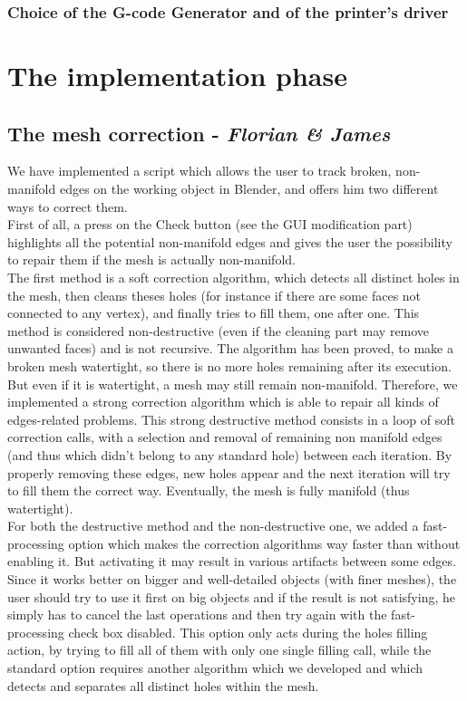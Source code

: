 \documentclass{report}
\begin{document}
\subsection{Choice of the G-code Generator and of the printer's driver}

\chapter{The implementation phase}

\section{The mesh correction - \textit{Florian \& James}}

We have implemented a script which allows the user to track broken, non-manifold edges on the working object in Blender, and offers him two different ways to correct them.\\

First of all, a press on the Check button (see the GUI modification part) highlights all the potential non-manifold edges and gives the user the possibility to repair them if the mesh is actually non-manifold.\\

The first method is a soft correction algorithm, which detects all distinct holes in the mesh, then cleans theses holes (for instance if there are some faces not connected to any vertex), and finally tries to fill them, one after one. This method is considered non-destructive (even if the cleaning part may remove unwanted faces) and is not recursive. The algorithm has been proved, to make a broken mesh watertight, so there is no more holes remaining after its execution.\\

But even if it is watertight, a mesh may still remain non-manifold. Therefore, we implemented a strong correction algorithm which is able to repair all kinds of edges-related problems. This strong destructive method consists in a loop of soft correction calls, with a selection and removal of remaining non manifold edges (and thus which didn't belong to any standard hole) between each iteration. By properly removing these edges, new holes appear and the next iteration will try to fill them the correct way. Eventually, the mesh is fully manifold (thus watertight).\\

For both the destructive method and the non-destructive one, we added a fast-processing option which makes the correction algorithms way faster than without enabling it. But activating it may result in various artifacts between some edges. Since it works better on bigger and well-detailed objects (with finer meshes), the user should try to use it first on big objects and if the result is not satisfying, he simply has to cancel the last operations and then try again with the fast-processing check box disabled. This option only acts during the holes filling action, by trying to fill all of them with only one single filling call, while the standard option requires another algorithm which we developed and which detects and separates all distinct holes within the mesh.
\end{document}
